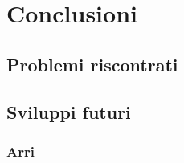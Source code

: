 \documentclass[main.tex]{subfiles}
\begin{document}
\sloppy


\vspace{1.0cm}

\section{Conclusioni}\label{sec:End}

\subsection{Problemi riscontrati}\label{subsec:6_Problems}

\subsection{Sviluppi futuri}\label{subsec:6_newDevelops}
\subsubsection{Arri}\label{subsec:6_1_Arri}
\end{document}
